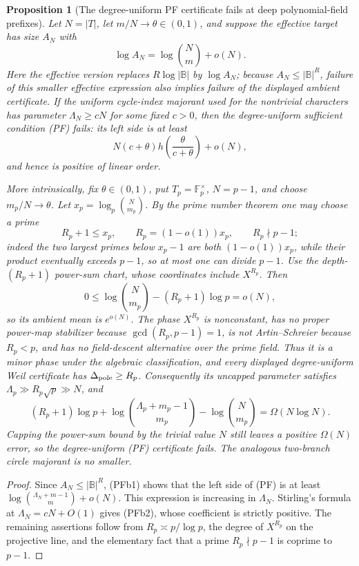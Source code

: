 \documentclass[12pt,a4paper]{amsart}
\numberwithin{equation}{section}
\newtheorem{proposition}[proposition]{Proposition}
\theoremstyle{remark}
\newcommand{\F}{\mathbb F}
\newcommand{\B}{\mathbb B}
\newcommand{\abs}[1]{\lvert #1\rvert}
\begin{document}
\begin{proposition}[The degree-uniform PF certificate fails at deep polynomial-field prefixes]
\label{prop:pf-deep-prefix-barrier}
Let \(N=\abs T\), let \(m/N\to\theta\in(0,1)\), and suppose the
effective target has size \(A_N\) with
\[
             \log A_N=\log\binom Nm+o(N).           \tag{PFb1}
\]
Here the effective version replaces \(R\log\abs\B\) by \(\log A_N\);
because \(A_N\le\abs\B^R\), failure of this smaller effective expression
also implies failure of the displayed ambient certificate.
If the uniform cycle-index majorant used for the nontrivial characters has
parameter \(\Lambda_N\ge cN\) for some fixed \(c>0\), then the
degree-uniform sufficient condition \textup{(PF)} fails: its left side is
at least
\[
 N(c+\theta)h\!\left(\frac{\theta}{c+\theta}\right)+o(N),
 \tag{PFb2}
\]
and hence is positive of linear order.

More intrinsically, fix \(\theta\in(0,1)\), put
\(T_p=\F_p^\times\), \(N=p-1\), and choose \(m_p/N\to\theta\).  Let
\(x_p=\log_p\binom N{m_p}\).  By the prime number theorem one may choose
a prime
\[
 R_p+1\le x_p,\qquad R_p=(1-o(1))x_p,\qquad R_p\nmid p-1;
\]
indeed the two largest primes below \(x_p-1\) are both
\((1-o(1))x_p\), while their product eventually exceeds \(p-1\), so at
most one can divide \(p-1\).  Use the depth-\((R_p+1)\) power-sum chart,
whose coordinates include \(X^{R_p}\).
Then
\[
 0\le\log\binom N{m_p}-(R_p+1)\log p=o(N),
\]
so its ambient mean is \(e^{o(N)}\).  The phase \(X^{R_p}\) is
nonconstant, has no proper power-map stabilizer because
\(\gcd(R_p,p-1)=1\), is not Artin--Schreier because \(R_p<p\), and has
no field-descent alternative over the prime field.  Thus it is a minor
phase under the algebraic classification, and every displayed
degree-uniform Weil certificate has \(\Delta_{\rm pole}\ge R_p\).
Consequently its uncapped parameter satisfies
\(\Lambda_p\gg R_p\sqrt p\gg N\), and
\[
 (R_p+1)\log p+\log\binom{\Lambda_p+m_p-1}{m_p}
 -\log\binom N{m_p}=\Omega(N\log N).
\]
Capping the power-sum bound by the trivial value \(N\) still leaves a
positive \(\Omega(N)\) error, so the degree-uniform \textup{(PF)}
certificate fails.  The analogous two-branch circle majorant is no
smaller.
\end{proposition}

\begin{proof}
Since \(A_N\le\abs\B^R\), \textup{(PFb1)} shows that the left side of
\textup{(PF)} is at least
\(\log\binom{\Lambda_N+m-1}{m}+o(N)\).  This expression is increasing
in \(\Lambda_N\).  Stirling's formula at \(\Lambda_N=cN+O(1)\) gives
\textup{(PFb2)}, whose coefficient is strictly positive.  The remaining
assertions follow from \(R_p\asymp p/\log p\), the degree of
\(X^{R_p}\) on the projective line, and the elementary fact that a prime
\(R_p\nmid p-1\) is coprime to \(p-1\).
\end{proof}
\end{document}
